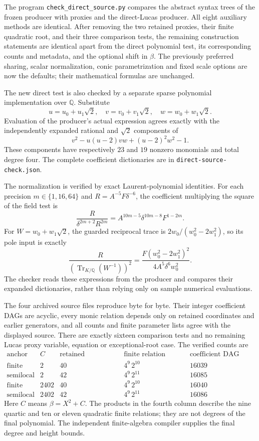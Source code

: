 \documentclass[11pt]{article}
\theoremstyle{definition}
\begin{document}
The program \texttt{check\_direct\_source.py} compares the abstract
syntax trees of the frozen producer with proxies and the direct-Lucas
producer.  All eight auxiliary methods are identical.  After removing
the two retained proxies, their finite quadratic root, and their three
comparison tests, the remaining construction statements are identical
apart from the direct polynomial test, its corresponding counts and
metadata, and the optional shift in $\beta$.  The previously preferred
sharing, scalar normalization, conic parametrization and fixed scale
options are now the defaults; their mathematical formulas are unchanged.

The new direct test is also checked by a separate sparse polynomial
implementation over $\mathbb Q$.  Substitute
\[
 u=u_0+u_1\sqrt2,\quad v=v_0+v_1\sqrt2,\quad
 w=w_0+w_1\sqrt2.
\]
Evaluation of the producer's actual expression agrees exactly with
the independently expanded rational and $\sqrt2$ components of
\[
                  v^2-u(u-2)vw+(u-2)^2w^2-1.
\]
These components have respectively $23$ and $19$ nonzero monomials
and total degree four.  The complete coefficient dictionaries are
in \texttt{direct-source-check.json}.

The normalization is verified by exact Laurent-polynomial identities.
For each precision $m\in\{1,16,64\}$ and
$R=A^{-5}F\delta^{-6}$, the coefficient multiplying the square of
the field test is
\[
 \frac{R}{\delta^{2m+2}R^{2m}}
          =A^{10m-5}\delta^{10m-8}F^{1-2m}.
\]
For $W=w_0+w_1\sqrt2$, the guarded reciprocal trace is
$2w_0/(w_0^2-2w_1^2)$, so its pole input is exactly
\[
 \frac{R}{(\operatorname{Tr}_{K/\mathbb Q}(W^{-1}))^2}
       =\frac{F(w_0^2-2w_1^2)^2}{4A^5\delta^6w_0^2}.
\]
The checker reads these expressions from the producer and compares
their expanded dictionaries, rather than relying only on sample
numerical evaluations.

The four archived source files reproduce byte for byte.  Their integer
coefficient DAGs are acyclic, every monic relation depends only on
retained coordinates and earlier generators, and all counts and finite
parameter lists agree with the displayed source.  There are exactly
sixteen comparison tests and no remaining Lucas proxy variable,
equation or exceptional-root case.  The verified counts are
\[
\begin{array}{c|c|c|c|c}
\text{anchor}&C&\text{retained coordinates}&
   \text{finite relation degrees}&\text{coefficient DAG nodes}\\\hline
\text{finite}&2&40&4^9\,2^{10}&16039\\
\text{semilocal}&2&42&4^9\,2^{11}&16085\\
\text{finite}&2402&40&4^9\,2^{10}&16040\\
\text{semilocal}&2402&42&4^9\,2^{11}&16086
\end{array}
\]
Here $C$ means $\beta=X^2+C$.  The products in the fourth column
describe the nine quartic and ten or eleven quadratic finite relations;
they are not degrees of the final polynomial.  The independent
finite-algebra compiler supplies the final degree and height bounds.
\end{document}
